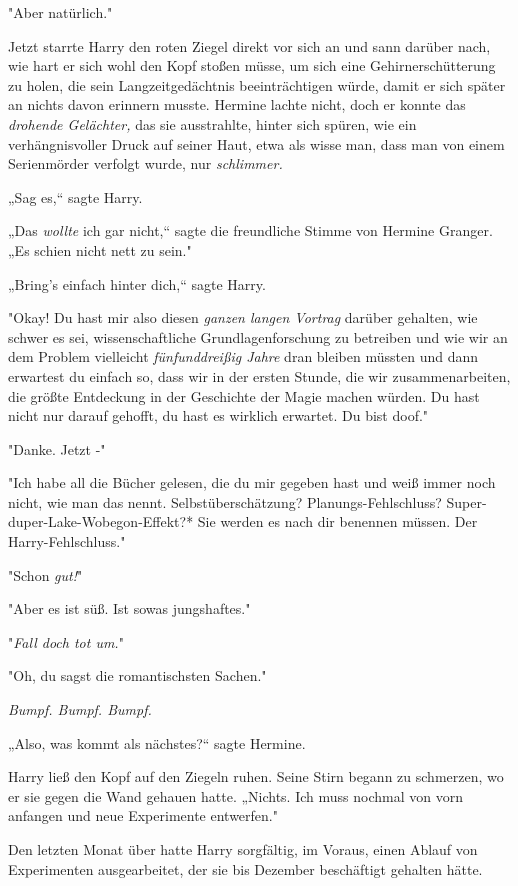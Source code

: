 {"Aber natürlich."

Jetzt starrte Harry den roten Ziegel direkt vor sich an und sann darüber nach, wie hart er sich wohl den Kopf stoßen müsse, um sich eine Gehirnerschütterung zu holen, die sein Langzeitgedächtnis beeinträchtigen würde, damit er sich später an nichts davon erinnern musste. Hermine lachte nicht, doch er konnte das \emph{drohende Gelächter,} das sie ausstrahlte, hinter sich spüren, wie ein verhängnisvoller Druck auf seiner Haut, etwa als wisse man, dass man von einem Serienmörder verfolgt wurde, nur \emph{schlimmer.}

„Sag es,“ sagte Harry.

„Das \emph{wollte} ich gar nicht,“ sagte die freundliche Stimme von Hermine Granger. „Es schien nicht nett zu sein."

„Bring's einfach hinter dich,“ sagte Harry.

"Okay! Du hast mir also diesen \emph{ganzen langen Vortrag} darüber gehalten, wie schwer es sei, wissenschaftliche Grundlagenforschung zu betreiben und wie wir an dem Problem vielleicht \emph{fünfunddreißig Jahre} dran bleiben müssten und dann erwartest du einfach so, dass wir in der ersten Stunde, die wir zusammenarbeiten, die größte Entdeckung in der Geschichte der Magie machen würden. Du hast nicht nur darauf gehofft, du hast es wirklich erwartet. Du bist doof."

"Danke. Jetzt -"

"Ich habe all die Bücher gelesen, die du mir gegeben hast und weiß immer noch nicht, wie man das nennt. Selbstüberschätzung? Planungs-Fehlschluss? Super-duper-Lake-Wobegon-Effekt?* Sie werden es nach dir benennen müssen. Der Harry-Fehlschluss."

"Schon \emph{gut!}"

"Aber es ist süß. Ist sowas jungshaftes."

"\emph{Fall doch tot um.}"

"Oh, du sagst die romantischsten Sachen."

\emph{Bumpf. Bumpf. Bumpf.}

„Also, was kommt als nächstes?“ sagte Hermine.

Harry ließ den Kopf auf den Ziegeln ruhen. Seine Stirn begann zu schmerzen, wo er sie gegen die Wand gehauen hatte. „Nichts. Ich muss nochmal von vorn anfangen und neue Experimente entwerfen."

Den letzten Monat über hatte Harry sorgfältig, im Voraus, einen Ablauf von Experimenten ausgearbeitet, der sie bis Dezember beschäftigt gehalten hätte.

}
